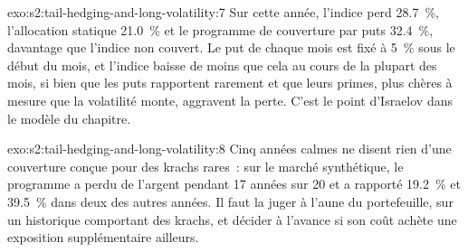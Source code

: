 \begin{solution}{exo:s2:tail-hedging-and-long-volatility:7}
Sur cette année, l'indice perd 28.7~\%, l'allocation statique 21.0~\% et le programme de couverture par puts 32.4~\%, davantage que l'indice non couvert. Le put de chaque mois est fixé
à 5~\% sous le début du mois, et l'indice baisse de moins que cela au cours de la plupart des mois, si bien que les puts rapportent rarement et que leurs primes, plus chères à mesure que la volatilité monte,
aggravent la perte. C'est le point d'Israelov dans le modèle du chapitre.
\end{solution}

\begin{solution}{exo:s2:tail-hedging-and-long-volatility:8}
Cinq années calmes ne disent rien d'une couverture conçue pour des krachs rares~: sur le marché synthétique, le programme a perdu de l'argent pendant 17 années sur 20 et a rapporté 19.2~\% et
39.5~\% dans deux des autres années. Il faut la juger à l'aune du portefeuille, sur un historique comportant des krachs, et décider à l'avance si son coût achète une exposition supplémentaire
ailleurs.
\end{solution}

